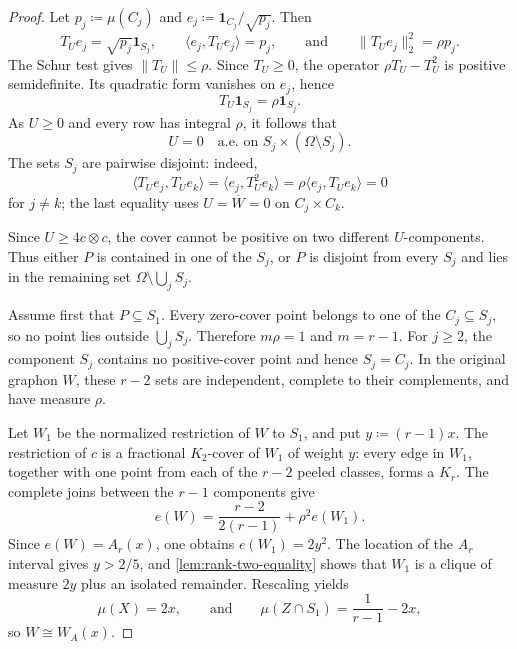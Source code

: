 \documentclass[10pt]{article}
\numberwithin{equation}{section}
\newcommand{\one}{\mathbf 1}
\begin{document}
\begin{proof}
Let $p_j\coloneqq\mu(C_j)$ and $e_j\coloneqq\one_{C_j}/\sqrt{p_j}$.  Then
\[
 T_Ue_j=\sqrt{p_j}\one_{S_j},
 \qquad
 \langle e_j,T_Ue_j\rangle=p_j,
 \qquad\text{and}\qquad
 \|T_Ue_j\|_2^2=\rho p_j.
\]
The Schur test gives $\|T_U\|\le\rho$.  Since $T_U\ge0$, the operator $\rho T_U-T_U^2$ is positive semidefinite.  Its quadratic form vanishes on $e_j$, hence
\[
 T_U\one_{S_j}=\rho\one_{S_j}.
\]
As $U\ge0$ and every row has integral $\rho$, it follows that
\begin{equation}\label{eq:Ucomponents}
 U=0\quad\text{a.e. on }S_j\times(\Omega\setminus S_j).
\end{equation}
The sets $S_j$ are pairwise disjoint: indeed,
\[
 \langle T_Ue_j,T_Ue_k\rangle
 =\langle e_j,T_U^2e_k\rangle
 =\rho\langle e_j,T_Ue_k\rangle=0
\]
for $j\ne k$; the last equality uses $U=\overline W=0$ on $C_j\times C_k$.

Since $U\ge4c\otimes c$, the cover cannot be positive on two different $U$-components.  Thus either $P$ is contained in one of the $S_j$, or $P$ is disjoint from every $S_j$ and lies in the remaining set $\Omega\setminus\bigcup_jS_j$.

Assume first that $P\subseteq S_1$.  Every zero-cover point belongs to one of the $C_j\subseteq S_j$, so no point lies outside $\bigcup_jS_j$.  Therefore $m\rho=1$ and $m=r-1$.  For $j\ge2$, the component $S_j$ contains no positive-cover point and hence $S_j=C_j$.  In the original graphon $W$, these $r-2$ sets are independent, complete to their complements, and have measure $\rho$.

Let $W_1$ be the normalized restriction of $W$ to $S_1$, and put $y\coloneqq(r-1)x$.  The restriction of $c$ is a fractional $K_2$-cover of $W_1$ of weight $y$: every edge in $W_1$, together with one point from each of the $r-2$ peeled classes, forms a $K_r$.  The complete joins between the $r-1$ components give
\[
 e(W)=\frac{r-2}{2(r-1)}+\rho^2e(W_1).
\]
Since $e(W)=A_r(x)$, one obtains $e(W_1)=2y^2$.  The location of the $A_r$ interval gives $y>2/5$, and \cref{lem:rank-two-equality} shows that $W_1$ is a clique of measure $2y$ plus an isolated remainder.  Rescaling yields
\[
 \mu(X)=2x,
 \qquad\text{and}\qquad
 \mu(Z\cap S_1)=\frac1{r-1}-2x,
\]
so $W\cong W_A(x)$.


\end{proof}
\end{document}

